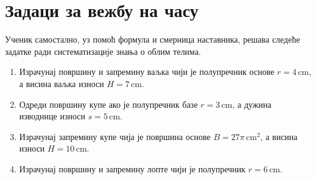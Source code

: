 \documentclass[12pt,a5paper]{article}
\begin{document}

\section{Задаци за вежбу на часу}

Ученик самостално, уз помоћ формула и смерница наставника, решава следеће задатке ради систематизације знања о облим телима.

\begin{enumerate}
    \item Израчунај површину и запремину ваљка чији је полупречник основе $r = 4\,\mathrm{cm}$, а висина ваљка износи $H = 7\,\mathrm{cm}$.
    \item Одреди површину купе ако је полупречник базе $r = 3\,\mathrm{cm}$, а дужина изводнице износи $s = 5\,\mathrm{cm}$.
    \item Израчунај запремину купе чија је површина основе $B = 27\pi\,\mathrm{cm}^2$, а висина износи $H = 10\,\mathrm{cm}$.
    \item Израчунај површину и запремину лопте чији је полупречник $r = 6\,\mathrm{cm}$.
\end{enumerate}
\end{document}
